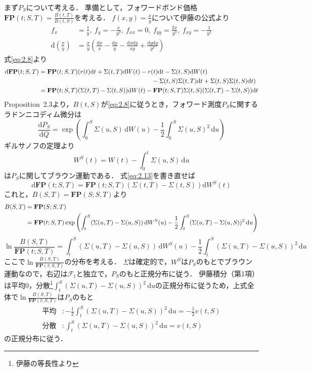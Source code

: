 \documentclass[a4paper, lualatex, ja=standard]{bxjsarticle}
\theoremstyle{theorem}
\theoremstyle{definition}
\newcommand{\F}{\mathcal{F}}
\newcommand{\FP}{\mathbf{FP}}
\newcommand{\diff}{\mathrm{d}}
\begin{document}
まず$P_S$について考える．
準備として，フォワードボンド価格$\FP(t;S,T)=\frac{B(t,T)}{B(t,S)}$を考える．
$f(x,y)=\frac{x}{y}$について伊藤の公式より
\begin{align*}
  f_x &= \frac{1}{y},\ f_y = -\frac{x}{y^2},\ f_{xx} = 0,\ f_{yy} = \frac{2x}{y^3},\ f_{xy} = -\frac{1}{y^2} \\
  \diff\left(\frac{x}{y}\right) &= \frac{x}{y}\left(\frac{\diff x}{x} - \frac{\diff y}{y} - \frac{\diff x\diff y}{xy} + \frac{\diff y\diff y}{y^2}\right)
\end{align*}
式\eqref{eq:2.8}より
\begin{align}
  \diff\FP(t;S,T) &= \FP(t;S,T)(r(t)\diff t+\Sigma(t,T)\diff W(t) - r(t)\diff t -\Sigma(t,S)\diff W(t)\notag\\
  &\hspace{18em} - \Sigma(t,S)\Sigma(t,T)\diff t + \Sigma(t,S)\Sigma(t,S)\diff t) \notag\\
  &= \FP(t;S,T)(\Sigma(t,T)-\Sigma(t,S))\diff W(t) - \FP(t;S,T)\Sigma(t,S)(\Sigma(t,T)-\Sigma(t,S))\diff t 
  \label{eq:2.13}
\end{align}
Proposition~2.3より，$B(t,S)$が\eqref{eq:2.8}に従うとき，フォワード測度$P_S$に関するラドンニコディム微分は
\begin{equation*}
  \frac{\diff P_S}{\diff Q} = \exp\left(\int_0^S\Sigma(u,S)\,\diff W(u) - \frac{1}{2}\int_0^S\Sigma(u,S)^2\,\diff u\right)
\end{equation*}
ギルサノフの定理より
\begin{equation}
  W^S(t) = W(t) - \int_0^t\Sigma(u,S)\,\diff u 
\end{equation}
は$P_S$に関してブラウン運動である．
式\eqref{eq:2.13}を書き直せば
\begin{equation}
  \diff\FP(t;S,T) = \FP(t;S,T)(\Sigma(t,T)-\Sigma(t,S))\diff W^S(t) 
\end{equation}
これと，$B(S,T)=\FP(S;S,T)$より
\begin{align}
  B(S,T) &= \FP(S;S,T) \notag\\
  &= \FP(t;S,T)\exp\left(\int_t^S(\Sigma(u,T)-\Sigma(u,S))\,\diff W^S(u)-\frac{1}{2}\int_t^S(\Sigma(u,T)-\Sigma(u,S))^2\,\diff u\right) \label{eq:2.16}
\end{align}
\begin{equation*}
  \ln\frac{B(S,T)}{\FP(t;S,T)} = \int_t^S(\Sigma(u,T)-\Sigma(u,S))\,\diff W^S(u) - \frac{1}{2}\int_t^S(\Sigma(u,T)-\Sigma(u,S))^2\,\diff u
\end{equation*}
ここで$\ln\frac{B(S,T)}{\FP(t;S,T)}$の分布を考える．
$\Sigma$は確定的で，$W^S$は$P_S$のもとでブラウン運動なので，右辺は$\F_t$と独立で，$P_S$のもと正規分布に従う．
伊藤積分（第1項）は平均$0$，分散\footnote{伊藤の等長性より}$\int_t^S(\Sigma(u,T)-\Sigma(u,S))^2\,\diff u$の正規分布に従うため，上式全体で$\ln\frac{B(S,T)}{\FP(t;S,T)}$は$P_S$のもと
\begin{align*}
  \text{平均} &: -\frac{1}{2}\int_t^S(\Sigma(u,T)-\Sigma(u,S))^2\,\diff u = -\frac{1}{2}v(t,S)\\
  \text{分散} &: \int_t^S(\Sigma(u,T)-\Sigma(u,S))^2\,\diff u = v(t,S)
\end{align*}
の正規分布に従う．
\end{document}
